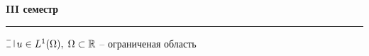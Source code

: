 
\begin{center}
  {\large \bf III семестр}
  \rule{\textwidth}{1pt}
\end{center}

\begin{definition}[Усреднение]
$\letus \, u \in L^1(\Omega), \; \Omega \subset \mathbb{R}$ -- ограниченая область
\end{definition}